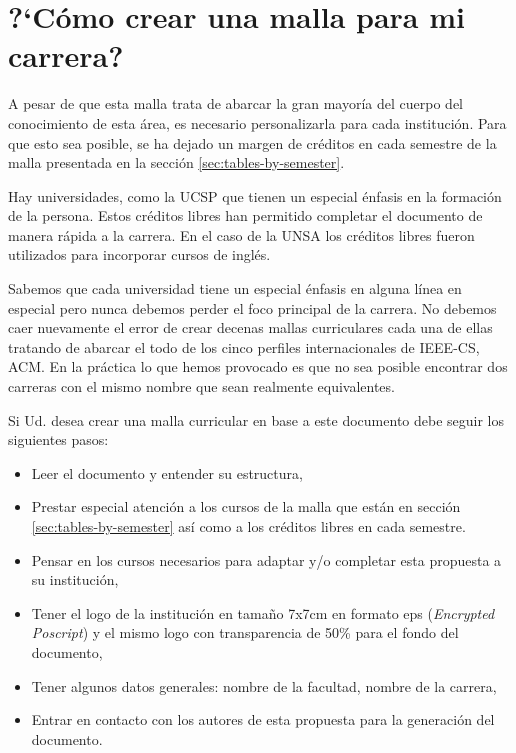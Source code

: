 \section*{?`Cómo crear una malla para mi carrera?}
%

A pesar de que esta malla trata de abarcar la gran mayorí­a del cuerpo del conocimiento de esta área,  
es necesario personalizarla para cada institución. Para que esto sea posible, se ha dejado un 
margen de créditos en cada semestre de la malla presentada en la sección \ref{sec:tables-by-semester}.

Hay universidades, como la \acf{UCSP} que tienen un especial énfasis en la formación de la persona. 
Estos créditos libres han permitido completar el documento de manera rápida a la carrera. 
En el caso de la \acf{UNSA} los créditos libres fueron utilizados para incorporar cursos de inglés. 

Sabemos que cada universidad tiene un especial énfasis en alguna lí­nea en especial pero nunca 
debemos perder el foco principal de la carrera. No debemos caer nuevamente el error de crear 
decenas mallas curriculares cada una de ellas tratando de abarcar el todo de los cinco perfiles 
internacionales de IEEE-CS, ACM. En la práctica lo que hemos provocado es que no sea posible 
encontrar dos carreras con el mismo nombre que sean realmente equivalentes. 

Si Ud. desea crear una malla curricular en base a este documento debe seguir los siguientes pasos:

\begin{itemize}
\item Leer el documento y entender su estructura,
\item Prestar especial atención a los cursos de la malla que están en sección \ref{sec:tables-by-semester} 
      así­ como a los créditos libres en cada semestre.
\item Pensar en los cursos necesarios para adaptar y/o completar esta propuesta a su institución,
\item Tener el logo de la institución en tamaño 7x7cm en formato eps (\textit{Encrypted Poscript}) y 
      el mismo logo con transparencia de 50\% para el fondo del documento,
\item Tener algunos datos generales: nombre de la facultad, nombre de la carrera, 
\item Entrar en contacto con los autores de esta propuesta para la generación del documento.
\end{itemize}

